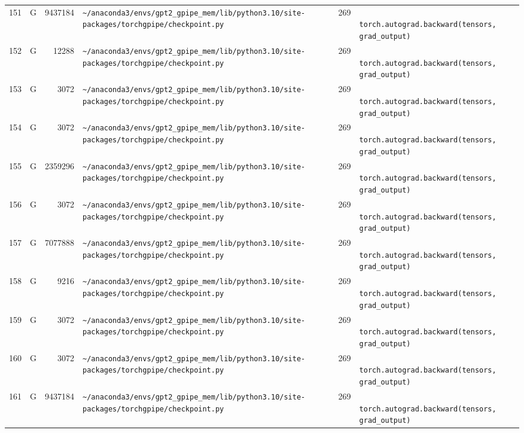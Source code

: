 \documentclass{article}
\begin{document}
\begin{longtable}{r l r p{6.5cm} r p{7.0cm}}
151 & G & 9437184 & \lstinline|~/anaconda3/envs/gpt2_gpipe_mem/lib/python3.10/site-packages/torchgpipe/checkpoint.py| & 269 & \lstinline|            torch.autograd.backward(tensors, grad_output)| \\
152 & G & 12288 & \lstinline|~/anaconda3/envs/gpt2_gpipe_mem/lib/python3.10/site-packages/torchgpipe/checkpoint.py| & 269 & \lstinline|            torch.autograd.backward(tensors, grad_output)| \\
153 & G & 3072 & \lstinline|~/anaconda3/envs/gpt2_gpipe_mem/lib/python3.10/site-packages/torchgpipe/checkpoint.py| & 269 & \lstinline|            torch.autograd.backward(tensors, grad_output)| \\
154 & G & 3072 & \lstinline|~/anaconda3/envs/gpt2_gpipe_mem/lib/python3.10/site-packages/torchgpipe/checkpoint.py| & 269 & \lstinline|            torch.autograd.backward(tensors, grad_output)| \\
155 & G & 2359296 & \lstinline|~/anaconda3/envs/gpt2_gpipe_mem/lib/python3.10/site-packages/torchgpipe/checkpoint.py| & 269 & \lstinline|            torch.autograd.backward(tensors, grad_output)| \\
156 & G & 3072 & \lstinline|~/anaconda3/envs/gpt2_gpipe_mem/lib/python3.10/site-packages/torchgpipe/checkpoint.py| & 269 & \lstinline|            torch.autograd.backward(tensors, grad_output)| \\
157 & G & 7077888 & \lstinline|~/anaconda3/envs/gpt2_gpipe_mem/lib/python3.10/site-packages/torchgpipe/checkpoint.py| & 269 & \lstinline|            torch.autograd.backward(tensors, grad_output)| \\
158 & G & 9216 & \lstinline|~/anaconda3/envs/gpt2_gpipe_mem/lib/python3.10/site-packages/torchgpipe/checkpoint.py| & 269 & \lstinline|            torch.autograd.backward(tensors, grad_output)| \\
159 & G & 3072 & \lstinline|~/anaconda3/envs/gpt2_gpipe_mem/lib/python3.10/site-packages/torchgpipe/checkpoint.py| & 269 & \lstinline|            torch.autograd.backward(tensors, grad_output)| \\
160 & G & 3072 & \lstinline|~/anaconda3/envs/gpt2_gpipe_mem/lib/python3.10/site-packages/torchgpipe/checkpoint.py| & 269 & \lstinline|            torch.autograd.backward(tensors, grad_output)| \\
161 & G & 9437184 & \lstinline|~/anaconda3/envs/gpt2_gpipe_mem/lib/python3.10/site-packages/torchgpipe/checkpoint.py| & 269 & \lstinline|            torch.autograd.backward(tensors, grad_output)| \\

\end{longtable}
\end{document}
